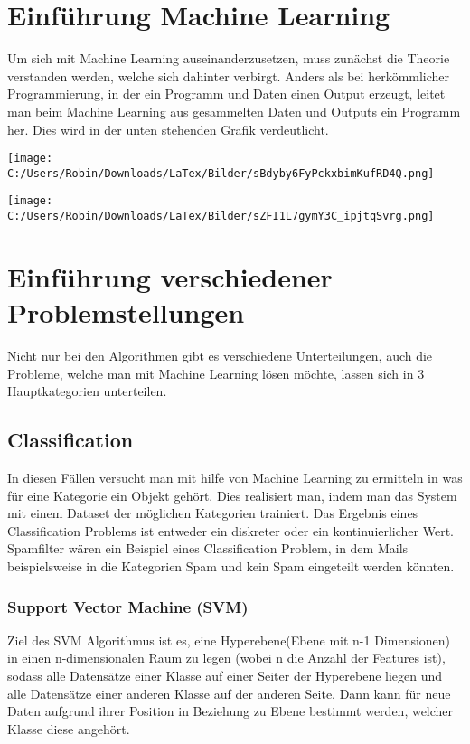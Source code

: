 \chapter{Einführung Machine Learning}
\label{chap:einführungMachineLearning}
Um sich mit Machine Learning auseinanderzusetzen, muss zunächst die Theorie verstanden werden, welche sich dahinter verbirgt. Anders als bei herkömmlicher Programmierung, in der ein Programm und Daten einen Output erzeugt, leitet man beim Machine Learning aus gesammelten Daten und Outputs ein Programm her. \cite[p.~3]{WML} Dies wird in der unten stehenden Grafik verdeutlicht.
\newline

\texttt{[image: C:/Users/Robin/Downloads/LaTex/Bilder/sBdyby6FyPckxbimKufRD4Q.png]}\linebreak
\linebreak

\texttt{[image: C:/Users/Robin/Downloads/LaTex/Bilder/sZFI1L7gymY3C\_ipjtqSvrg.png]}
\cite[p.~3]{WML}

\chapter{Einführung verschiedener Problemstellungen}
\label{chap:einführungProblemstellungen}
Nicht nur bei den Algorithmen gibt es verschiedene Unterteilungen, auch die Probleme, welche man mit Machine Learning lösen möchte, lassen sich in 3 Hauptkategorien unterteilen.

\section{Classification}
\label{sec:classification}
In diesen Fällen versucht man mit hilfe von Machine Learning zu ermitteln in was für eine Kategorie ein Objekt gehört. \cite{SKL} Dies realisiert man, indem man das System mit einem Dataset der möglichen Kategorien trainiert. Das Ergebnis eines Classification Problems ist entweder ein diskreter oder ein kontinuierlicher Wert.\cite[p.~4]{WML} Spamfilter wären ein Beispiel eines Classification Problem, in dem Mails beispielsweise in die Kategorien Spam und kein Spam eingeteilt werden könnten. 

\subsection{Support Vector Machine (SVM)}
\label{sec:SVM}
Ziel des SVM Algorithmus ist es, eine Hyperebene(Ebene mit n-1 Dimensionen) in einen n-dimensionalen Raum zu legen (wobei n die Anzahl der Features ist), sodass alle Datensätze einer Klasse auf einer Seiter der Hyperebene liegen und alle Datensätze einer anderen Klasse auf der anderen Seite. Dann kann für neue Daten aufgrund ihrer Position in Beziehung zu Ebene bestimmt werden, welcher Klasse diese angehört.\cite[p.~177f.]{WML} 

